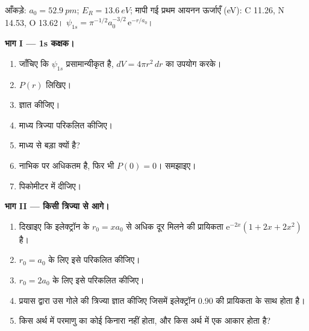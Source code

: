 \begin{problem}
\label{pb:b2:atomic-orbitals:1}
आँकड़े: $a_0 = \qty{52.9}{pm}$; $E_R = \qty{13.6}{eV}$; मापी गई प्रथम आयनन
ऊर्जाएँ (\unit{eV}): C 11.26, N 14.53, O 13.62। $\psi_{1s} = \pi^{-1/2}a_0^{-3/2}\,
\mathrm e^{-r/a_0}$।

\medskip
\noindent\textbf{भाग I --- 1s कक्षक।}
\begin{enumerate}
  \item जाँचिए कि $\psi_{1s}$ प्रसामान्यीकृत है, $dV = 4\pi r^2\,dr$ का उपयोग करके।
  \item {} $P(r)$ लिखिए।
  \item {} ज्ञात कीजिए।
  \item माध्य त्रिज्या परिकलित कीजिए।
  \item माध्य  से बड़ा क्यों है?
  \item {} नाभिक पर अधिकतम है, फिर भी $P(0) = 0$।
        समझाइए।
  \item {} पिकोमीटर में दीजिए।
\end{enumerate}

\medskip
\noindent\textbf{भाग II --- किसी त्रिज्या से आगे।}
\begin{enumerate}[resume]
  \item दिखाइए कि इलेक्ट्रॉन के $r_0 =
        xa_0$ से अधिक दूर मिलने की प्रायिकता $\mathrm e^{-2x}(1 + 2x + 2x^2)$ है।
  \item $r_0 = a_0$ के लिए इसे परिकलित कीजिए।
  \item $r_0 = 2a_0$ के लिए इसे परिकलित कीजिए।
  \item प्रयास द्वारा उस गोले की त्रिज्या ज्ञात कीजिए जिसमें इलेक्ट्रॉन 0.90 की
        प्रायिकता के साथ होता है।
  \item किस अर्थ में परमाणु का कोई किनारा नहीं होता, और किस अर्थ में एक आकार होता है?
\end{enumerate}


\end{problem}
